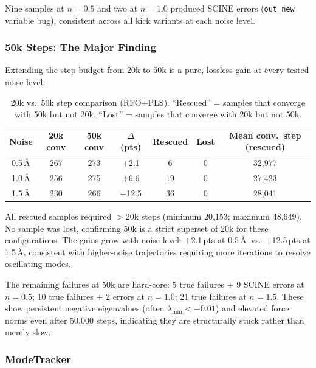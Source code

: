 \documentclass[11pt,a4paper]{article}
\theoremstyle{definition}
\begin{document}
Nine samples at $n=0.5$ and two at $n=1.0$ produced SCINE errors
(\texttt{out\_new} variable bug), consistent across all kick variants
at each noise level.

\subsubsection{50k Steps: The Major Finding}
\label{sec:v12-50k}

Extending the step budget from 20k to 50k is a pure, lossless gain at
every tested noise level:

\begin{table}[h]
\centering
\caption{20k vs.\ 50k step comparison (RFO+PLS).  ``Rescued'' = samples
  that converge with 50k but not 20k.  ``Lost'' = samples that converge
  with 20k but not 50k.}
\label{tab:v12-50k}
\begin{tabular}{ccccccc}
\toprule
Noise & 20k conv & 50k conv & $\Delta$ (pts) & Rescued & Lost & Mean conv.\ step (rescued) \\
\midrule
0.5\,\AA & 267 & 273 & $+$2.1 &  6 & 0 & 32{,}977 \\
1.0\,\AA & 256 & 275 & $+$6.6 & 19 & 0 & 27{,}423 \\
1.5\,\AA & 230 & 266 & $+$12.5 & 36 & 0 & 28{,}041 \\
\bottomrule
\end{tabular}
\end{table}

All rescued samples required $>$20k steps (minimum 20{,}153; maximum
48{,}649).  No sample was lost, confirming 50k is a strict superset of 20k
for these configurations.  The gains grow with noise level: $+$2.1\,pts at
0.5\,\AA\ vs.\ $+$12.5\,pts at 1.5\,\AA, consistent with higher-noise
trajectories requiring more iterations to resolve oscillating modes.

The remaining failures at 50k are hard-core: 5 true failures $+$ 9
SCINE errors at $n=0.5$; 10 true failures $+$ 2 errors at $n=1.0$; 21
true failures at $n=1.5$.  These show persistent negative eigenvalues
(often $\lambda_\text{min} < -0.01$) and elevated force norms even after
50{,}000 steps, indicating they are structurally stuck rather than merely
slow.

\subsubsection{ModeTracker}
\label{sec:v12-modetracker}
\end{document}
